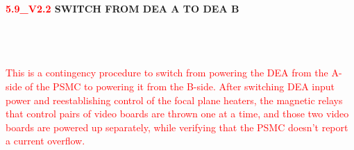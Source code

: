 \documentclass[11pt]{article}
\begin{document}
\newcommand{\be}{\begin{enumerate}}
\newcommand{\ee}{\end{enumerate}}
\newcommand{\bc}{\begin{center}}
\newcommand{\ec}{\end{center}}
\newcommand{\bi}{\begin{itemize}}
\newcommand{\ei}{\end{itemize}}
\newcommand{\bd}{\begin{description}}
\newcommand{\ed}{\end{description}}
\newcommand{\bt}{\begin{tabbing}}
\newcommand{\et}{\end{tabbing}}
\newcommand{\eg}{{\it e.g.~}}
\newcommand{\ie}{{\it i.e.~}}
\newcommand{\ul}{\underline}
\newcommand{\axaf}{{\em AXAF}}
\def\la{\hbox{\rlap{$<$}\lower0.5ex\hbox{$\sim$}\ }}

\centerline{\large {\bf \textcolor{red}{5.9\_V2.2} SWITCH FROM DEA A TO DEA B }}
\vspace{0.25in}

\\
 \\


\\

\textcolor{red}{This is a contingency procedure to switch from powering the DEA from the
A-side of the PSMC to powering it from the B-side.
After switching DEA input power and reestablishing control of the
focal plane heaters, the magnetic relays that control pairs
of video boards are thrown one at a time,
and those two video boards are powered up separately,
while verifying that the PSMC doesn't report a current overflow.}

\vspace{0.15in}
\end{document}
